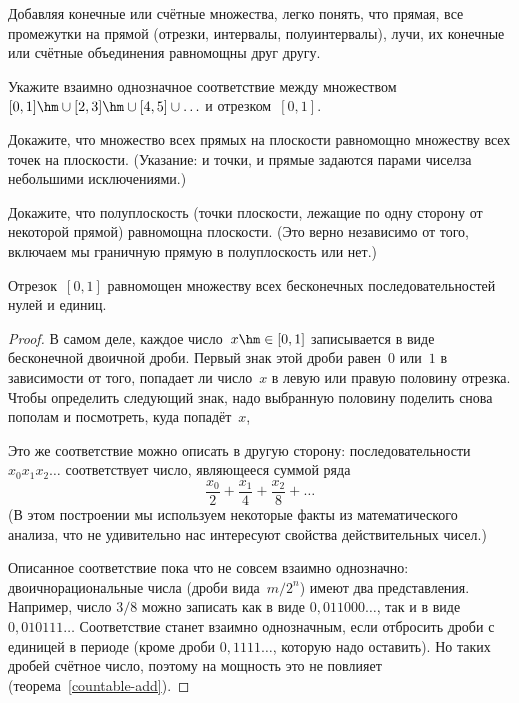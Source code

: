Добавляя конечные или счётные множества, легко понять, что
прямая, все промежутки на прямой (отрезки, интервалы,
полуинтервалы), лучи, их конечные или счётные объединения 
равномощны друг другу.

\smallskip

\begin{problem}
Укажите взаимно однозначное соответствие между
множеством $[0,1]\hm\cup[2,3]\hm\cup[4,5]\cup\ldots$ и
отрезком~$[0,1]$.
\end{problem}

\begin{problem}
Докажите, что множество всех прямых на плоскости
равномощно множеству всех точек на плоскости. (Указание:
и точки, и прямые задаются парами чисел\т за небольшими
исключениями.)
\end{problem}

\begin{problem}
Докажите, что полуплоскость (точки плоскости, лежащие по
одну сторону от некоторой прямой) равномощна плоскости.
(Это верно независимо от того, включаем мы граничную
прямую в полуплоскость или нет.)
\end{problem}

\begin{theorem}
        \label{continuum-sequences}
Отрезок~$[0,1]$ равномощен множеству всех
бесконечных последовательностей нулей и единиц.
\end{theorem}

\begin{proof}
В самом деле, каждое число~$x\hm\in[0,1]$ записывается
в виде бесконечной двоичной дроби. Первый знак этой дроби
равен~$0$ или~$1$ в зависимости от того, попадает ли
число~$x$ в левую или правую половину отрезка. Чтобы
определить следующий знак, надо выбранную половину
поделить снова пополам и посмотреть, куда попадёт~$x$,~

Это же соответствие можно описать в другую сторону:
последовательности $x_0x_1x_2\dots$ соответствует число,
являющееся суммой ряда
        $$
\frac{x_0}{2} + \frac{x_1}{4} + \frac{x_2}{8} + \ldots
        $$
(В этом построении мы используем некоторые факты
из математического анализа, что не удивительно\т
нас интересуют свойства действительных чисел.)

Описанное соответствие пока что не совсем взаимно однозначно:
двоично\д рациональные числа (дроби вида~$m/2^n$) имеют два
представления. Например, число $3/8$ можно записать как в виде
$0{,}011000{\dots}$, так и в виде $0{,}010111{\dots}$
Соответствие станет
взаимно однозначным, если отбросить дроби с единицей в периоде
(кроме дроби $0{,}1111\ldots$, которую надо оставить).
Но таких дробей счётное число, поэтому на мощность это не повлияет (теорема~\ref{countable-add}).
\end{proof}

